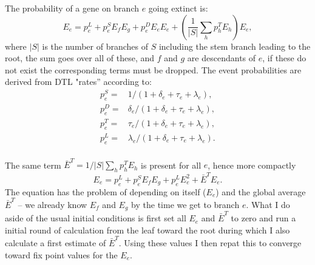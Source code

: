 \documentclass[preprint,superscriptaddress,aip,author-year]{revtex4-1}
\begin{document}
The probability of a gene on branch $e$ going extinct is:
\begin{equation}
E_e = p^L_e + p^S_e E_f E_g  + p^D_e E_e E_e + \left( \frac{1}{|S|} \sum_h p^T_h E_h
\right) E_e,
\end{equation}
where $|S|$ is the number of branches of $S$ including the stem branch
leading to the root, the sum goes over all of these, and $f$ and
$g$ are descendants of $e$, if these do not exist the corresponding
terms must be dropped. The event
probabilities are derived from DTL "rates'' according to:
\begin{align}
 p^S_e =& 1 / (1 + \delta_e + \tau_e + \lambda_e), \nonumber \\
 p^D_e =& \delta_e / (1 + \delta_e + \tau_e + \lambda_e),\nonumber \\
 p^T_e =& \tau_e / (1 + \delta_e + \tau_e + \lambda_e),\nonumber \\
 p^L_e =& \lambda_e / (1 + \delta_e + \tau_e + \lambda_e)\nonumber. \\
\end{align}

   The same term $\bar E^T = 1/|S| \sum_h p^T_h E_h$ is present
  for all $e$, hence more compactly  
\begin{equation}
E_e = p^L_e + p^S_e E_f E_g  + p^L_eE_e^2 +\bar E^T E_e.
\end{equation}
The equation has the problem of depending on itself ($E_e$) and the
global average $\bar E^T$ -- we already know $E_f$ and $E_g$ by the
time we get to branch $e$. What I do
aside of the usual initial conditions is first set all $E_e$ and $\bar
E^T$  to zero
and run a initial round of calculation from the leaf toward the root
during which I also calculate a first estimate of $\bar E^T$.
Using these values I then repat this to converge toward fix point values for the $E_e$.    
\end{document}
